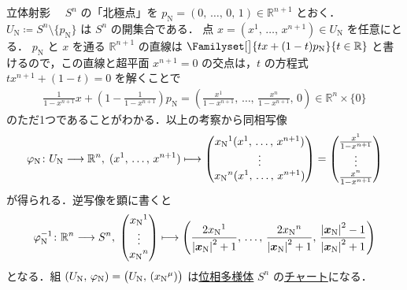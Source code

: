 \documentclass[geometry_main]{subfiles}
\begin{document}
\begin{myexample}[label=ex:stereographic-projection]{立体射影}
	　$S^n$ の「北極点」を $p_{\mathrm{N}} = (0,\, \dots ,\, 0,\,  1) \in \mathbb{R}^{n+1}$ とおく．$U_{\mathrm{N}} \coloneqq S^n \setminus \{ p_{\mathrm{N}} \}$ は $S^n$ の開集合である．
	点 $x = (x^1,\, \dots,\, x^{n+1}) \in U_{\mathrm{N}}$ を任意にとる．
	$p_{\mathrm{N}}$ と $x$ を通る $\mathbb{R}^{n+1}$ の直線は
	$\Familyset[\big]{t x + (1-t) p_{\mathrm{N}}}{t \in \mathbb{R}}$
	と書けるので，この直線と超平面 $x^{n+1} = 0$ の交点は，$t$ の方程式 $t x^{n+1} + (1-t) = 0$ を解くことで
	\begin{align}
		\frac{1}{1-x^{n+1}} x + \left( 1 - \frac{1}{1-x^{n+1}} \right) p_{\mathrm{N}} = \left( \frac{x^1}{1-x^{n+1}},\, \dots,\, \frac{x^n}{1-x^{n+1}},\, 0 \right) \in \mathbb{R}^n \times \{0\}
	\end{align}
	のただ1つであることがわかる．以上の考察から同相写像
	\begin{align}
		\varphi_{\mathrm{N}} \colon U_{\mathrm{N}} \lto \mathbb{R}^{n},\; (x^1,\, \dots,\, x^{n+1}) \lmto \mqty(x_{\mathrm{N}}{}^1(x^1,\, \dots,\, x^{n+1}) \\ \vdots \\ x_{\mathrm{N}}{}^n(x^1,\, \dots,\, x^{n+1})) = \mqty(\frac{x^1}{1-x^{n+1}}\\ \vdots \\ \frac{x^n}{1-x^{n+1}})
	\end{align}
	が得られる．逆写像を顕に書くと
	\begin{align}
		\varphi_{\mathrm{N}}^{-1} \colon \mathbb{R}^n \lto S^n,\;
		\mqty(x_{\mathrm{N}}{}^1 \\ \vdots \\ x_{\mathrm{N}}{}^n) \lmto \left(\frac{2 x_{\mathrm{N}}{}^1}{\abs{\vb*{x}_{\mathrm{N}}}^2 +1}, \, \dots,\, \frac{2 x_{\mathrm{N}}{}^n}{\abs{\vb*{x}_{\mathrm{N}}}^2 +1},\, \frac{\abs{\vb*{x}_{\mathrm{N}}}^2 -1}{\abs{\vb*{x}_{\mathrm{N}}}^2 +1}\right)
	\end{align}
	となる．組 $(U_{\mathrm{N}},\, \varphi_{\mathrm{N}}) = \bigl(U_{\mathrm{N}},\, (x_{\mathrm{N}}{}^\mu)\bigr)$ は\hyperref[def.topomani]{位相多様体} $S^n$ の\hyperref[def.topomani]{チャート}になる．
	

\end{myexample}
\end{document}
